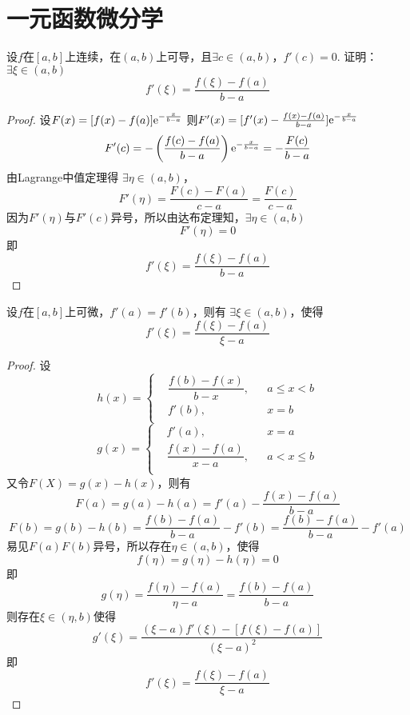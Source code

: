 \section{一元函数微分学}

\begin{proposition}
    
    设$f$在$[a,b]$上连续，在$(a,b)$上可导，且$\exists c\in (a,b)$，$f'(c)=0$.
    证明：$\exists \xi \in (a,b)$
    $$f'(\xi) = \dfrac{f(\xi)-f(a)}{b-a}$$

\end{proposition}

\begin{proof}
    
    设$F(x)= [f(x)-f(a)]\mathrm{e}^{-\frac{x}{b-a}}$
    则$F'(x)=[f'(x)-\frac{f(x)-f(a)}{b-a}]\mathrm{e}^{-\frac{x}{b-a}}$
    $$F'(c)= -\left(\dfrac{f(c)-f(a)}{b-a}\right)\mathrm{e}^{-\frac{x}{b-a}}=-\dfrac{F(c)}{b-a}$$
    由\textup{Lagrange}中值定理得
    $\exists \eta \in (a,b)$，
    $$F'(\eta) = \dfrac{F(c)-F(a)}{c-a} = \dfrac{F(c)}{c-a}$$
    因为$F'(\eta)$与$F'(c)$异号，所以由达布定理知，$\exists \eta \in (a,b)$
    $$F'(\eta) = 0$$
    即
    $$f'(\xi) = \dfrac{f(\xi)-f(a)}{b-a}$$

\end{proof}

\begin{theorem}[Flett中值定理]
    
    设$f$在$[a,b]$上可微，$f'(a)=f'(b)$，则有
    $\exists \xi \in (a,b)$，使得
    $$f'(\xi) = \dfrac{f(\xi)-f(a)}{\xi - a}$$

\end{theorem}

\begin{proof}
    
    设$$h(x)=\left\{
        \begin{aligned}
            &\dfrac{f(b)-f(x)}{b-x}, &&a \leq x < b\\
            &f'(b), &&x = b\\
        \end{aligned}
    \right.
    $$
    $$g(x)=\left\{
        \begin{aligned}
            &f'(a), &&x = a\\
            &\dfrac{f(x)-f(a)}{x-a}, &&a < x \leq b\\
        \end{aligned}
    \right.
    $$
    又令$F(X)=g(x)-h(x)$，则有
    $$F(a) = g(a) - h(a) = f'(a) - \dfrac{f(x)-f(a)}{b-a}$$
    $$F(b) = g(b) - h(b) = \dfrac{f(b) - f(a)}{b-a}  - f'(b) = \dfrac{f(b) - f(a)}{b-a} - f'(a)$$
    易见$F(a)F(b)$异号，所以存在$\eta \in (a,b)$，使得
    $$ f(\eta) = g(\eta) -h(\eta) = 0$$
    即
    $$g(\eta) = \dfrac{f(\eta) - f(a)}{\eta - a }= \dfrac{f(b) - f(a)}{b-a}$$
    则存在$\xi \in (\eta,b)$使得
    $$g'(\xi) = \dfrac{(\xi -a )f'(\xi)-[f(\xi) - f(a)]}{(\xi - a)^2}$$
    即
    $$f'(\xi) = \dfrac{f(\xi)-f(a)}{\xi - a}$$

\end{proof}

